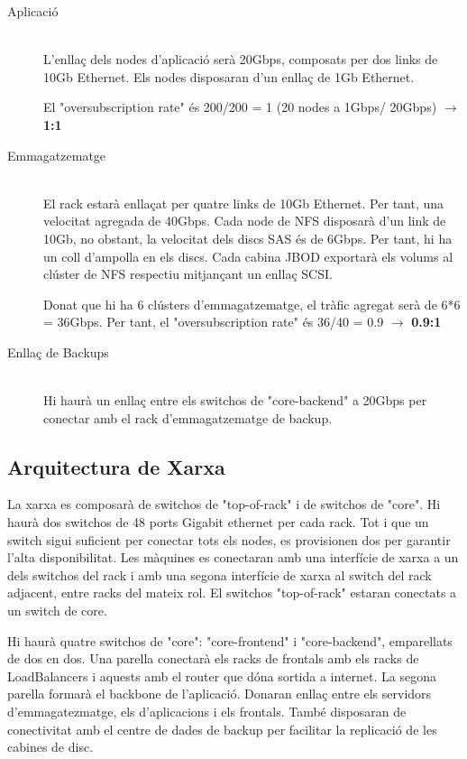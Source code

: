 \begin{description}
            
        \item[Aplicació] \hfill \\
           L'enllaç dels nodes d'aplicació serà 20Gbps, composats per dos links de 10Gb Ethernet. Els nodes disposaran d'un enllaç de 1Gb Ethernet. 
        
           El "oversubscription rate" és 200/200 = 1 (20 nodes a 1Gbps/ 20Gbps) $\rightarrow$ \textbf{1:1}
           
        \item[Emmagatzematge] \hfill \\
            El rack estarà enllaçat per quatre links de 10Gb Ethernet. Per tant, una velocitat agregada de 40Gbps. Cada node de NFS disposarà d'un link de 10Gb, no obstant, la velocitat dels discs SAS és de 6Gbps. Per tant, hi ha un coll d'ampolla en els discs. Cada cabina JBOD exportarà els volums al clúster de NFS respectiu mitjançant un enllaç SCSI.  
        
            Donat que hi ha 6 clústers d'emmagatzematge, el tràfic agregat serà de 6*6 = 36Gbps. Per tant, el "oversubscription rate" és 36/40 = 0.9 $\rightarrow$ \textbf{0.9:1}
            
            
         \item[Enllaç de Backups] \hfill \\
            Hi haurà un enllaç entre els switchos de "core-backend" a 20Gbps per conectar amb el rack d'emmagatzematge de backup.
            
    \end{description}



\subsection{Arquitectura de Xarxa}

La xarxa es composarà de switchos de "top-of-rack" i de switchos de "core". Hi haurà dos switchos de 48 ports Gigabit ethernet per cada rack. Tot i que un switch sigui suficient per conectar tots els nodes, es provisionen dos per garantir l'alta disponibilitat. Les màquines es conectaran amb una interfície de xarxa a un dels switchos del rack i amb una segona interfície de xarxa al switch del rack adjacent, entre racks del mateix rol. El switchos "top-of-rack" estaran conectats a un switch de core. 

Hi haurà quatre switchos de "core": "core-frontend" i "core-backend", emparellats de dos en dos. Una parella conectarà els racks de frontals amb els racks de LoadBalancers i aquests amb el router que dóna sortida a internet. La segona parella formarà el backbone de l'aplicació. Donaran enllaç entre els servidors d'emmagatezmatge, els d'aplicacions i els frontals. També disposaran de conectivitat amb el centre de dades de backup per facilitar la replicació de les cabines de disc. 


